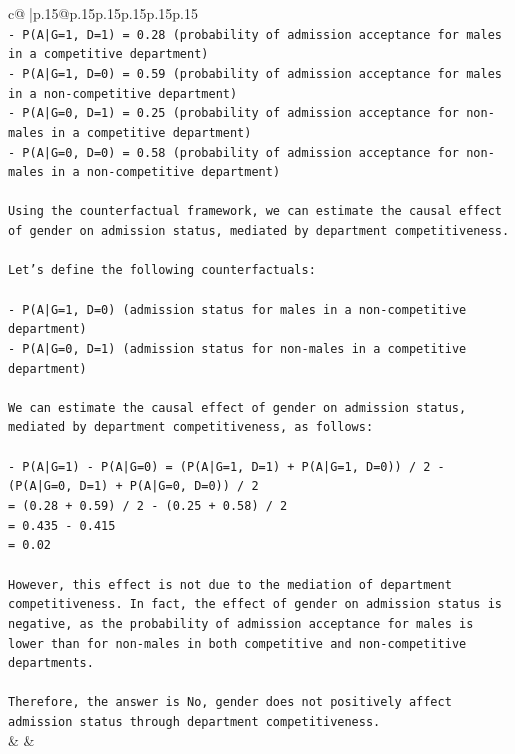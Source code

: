 \documentclass{article}
\begin{document}
{\begin{supertabular}{c@{$\;$}|p{.15\linewidth}@{}p{.15\linewidth}p{.15\linewidth}p{.15\linewidth}p{.15\linewidth}p{.15\linewidth}}
{{{\\ 
\texttt{{-} P(A|G=1, D=1) = 0.28 (probability of admission acceptance for males in a competitive department)} \\
\texttt{{-} P(A|G=1, D=0) = 0.59 (probability of admission acceptance for males in a non{-}competitive department)} \\
\texttt{{-} P(A|G=0, D=1) = 0.25 (probability of admission acceptance for non{-}males in a competitive department)} \\
\texttt{{-} P(A|G=0, D=0) = 0.58 (probability of admission acceptance for non{-}males in a non{-}competitive department)} \\
\\ 
\texttt{Using the counterfactual framework, we can estimate the causal effect of gender on admission status, mediated by department competitiveness. } \\
\\ 
\texttt{Let's define the following counterfactuals:} \\
\\ 
\texttt{{-} P(A|G=1, D=0) (admission status for males in a non{-}competitive department)} \\
\texttt{{-} P(A|G=0, D=1) (admission status for non{-}males in a competitive department)} \\
\\ 
\texttt{We can estimate the causal effect of gender on admission status, mediated by department competitiveness, as follows:} \\
\\ 
\texttt{{-} P(A|G=1) {-} P(A|G=0) = (P(A|G=1, D=1) + P(A|G=1, D=0)) / 2 {-} (P(A|G=0, D=1) + P(A|G=0, D=0)) / 2} \\
\texttt{= (0.28 + 0.59) / 2 {-} (0.25 + 0.58) / 2} \\
\texttt{= 0.435 {-} 0.415} \\
\texttt{= 0.02} \\
\\ 
\texttt{However, this effect is not due to the mediation of department competitiveness. In fact, the effect of gender on admission status is negative, as the probability of admission acceptance for males is lower than for non{-}males in both competitive and non{-}competitive departments.} \\
\\ 
\texttt{Therefore, the answer is No, gender does not positively affect admission status through department competitiveness.} \\
            }
        }
    }
    & & \\ \\


\end{supertabular}}
\end{document}
